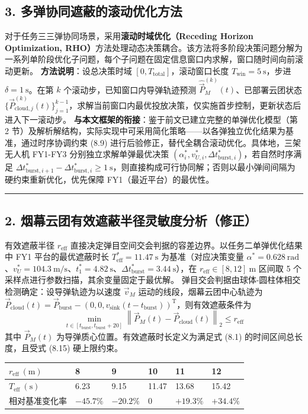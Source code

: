 \documentclass{JXUSTmodeling}
\begin{document}
\subsection{3. 多弹协同遮蔽的滚动优化方法}
对于任务三三弹协同场景，采用\textbf{滚动时域优化（Receding Horizon Optimization, RHO）}方法处理动态决策耦合。该方法将多阶段决策问题分解为一系列单阶段优化子问题，每个子问题在固定信息窗口内求解，窗口随时间向前滚动更新。
\textbf{方法说明}：设总决策时域 $[0, T_{\mathrm{total}}]$，滚动窗口长度 $T_{\mathrm{win}} = 5\ \mathrm{s}$，步进 $\delta = 1\ \mathrm{s}$。在第 $k$ 个滚动步，已知窗口内导弹轨迹预测 $\hat{\vec{P}}_M^{(k)}(t)$、已部署云团状态 $\{\vec{P}_{\mathrm{cloud},j}^{(k)}(t)\}_{j=1}^{k-1}$，求解当前窗口内最优投放决策，仅实施首步控制，更新状态后进入下一滚动步。
\textbf{与本文框架的衔接}：鉴于前文已建立完整的单弹优化模型（第 2 节）及解析解结构，实际实现中可采用简化策略——以各弹独立优化结果为基准，通过时序协调约束 (8.9) 进行后验修正，替代全耦合滚动优化。具体地，三架无人机 FY1-FY3 分别独立求解单弹最优决策 $(\alpha_i^*, v_{U,i}^*, \Delta t_{\mathrm{burst},i}^*)$，若自然时序满足 $\Delta t_{\mathrm{burst},i+1}^* - \Delta t_{\mathrm{burst},i}^* \geq 1\ \mathrm{s}$，则直接构成可行协同解；否则以最小弹间间隔为硬约束重新优化，优先保障 FY1（最近平台）的最优性。
\noindent\rule{\textwidth}{0.4pt}
\subsection{2. 烟幕云团有效遮蔽半径灵敏度分析（修正）}
有效遮蔽半径 $r_{\mathrm{eff}}$ 直接决定弹目空间交会判据的容差边界。以任务二单弹优化结果中 FY1 平台的最优遮蔽时长 $T_{\mathrm{eff}}^* = 11.47\ \mathrm{s}$ 为基准（对应决策变量 $\alpha^* = 0.628\ \mathrm{rad}$、$v_U^* = 104.3\ \mathrm{m/s}$、$t_1^* = 4.82\ \mathrm{s}$、$\Delta t_{\mathrm{burst}}^* = 3.44\ \mathrm{s}$），在 $r_{\mathrm{eff}} \in [8, 12]\ \mathrm{m}$ 区间取 5 个采样点进行参数扫描，其余变量固定于最优解。
弹目交会判据由球体-圆柱体相交检测确定：设导弹轨迹为以速度 $\vec{v}_M$ 运动的线段，烟幕云团中心轨迹为 $\vec{P}_{\mathrm{cloud}}(t) = \vec{P}_{\mathrm{burst}} - (0, 0, v_{\mathrm{sink}}(t-t_{\mathrm{burst}}))^{\mathrm{T}}$，则有效遮蔽条件为
\begin{equation}
\min_{t \in [t_{\mathrm{burst}}, t_{\mathrm{burst}}+20]} \left\| \vec{P}_M(t) - \vec{P}_{\mathrm{cloud}}(t) \right\|_2 \leq r_{\mathrm{eff}} \tag{8.1}
\end{equation}
其中 $\vec{P}_M(t)$ 为导弹质心位置。有效遮蔽时长定义为满足式 (8.1) 的时间区间总长度，且受式 (8.15) 硬上限约束。
\begin{table}[htbp]
  \centering
  \begin{tabularx}{\textwidth}{YYYYYY}
    \toprule
    $r_{\mathrm{eff}}\ (\mathrm{m})$ & 8 & 9 & 10 & 11 & 12 \\
    \midrule
    $T_{\mathrm{eff}}\ (\mathrm{s})$ & 6.23 & 9.15 & 11.47 & 13.68 & 15.42 \\
    相对基准变化率 & $-45.7\%$ & $-20.2\%$ & 0 & $+19.3\%$ & $+34.4\%$ \\
    \bottomrule
  \end{tabularx}
\end{table}
\end{document}
